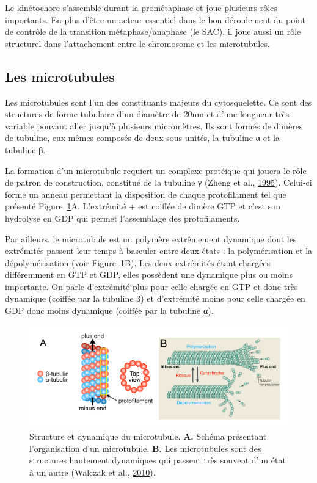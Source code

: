 \documentclass[12pt,a4paper,twoside,openright]{book}
\begin{document}
Le kinétochore s'assemble durant la prométaphase et joue plusieurs rôles
importants. En plus d'être un acteur essentiel dans le bon déroulement
du point de contrôle de la transition métaphase/anaphase (le SAC), il
joue aussi un rôle structurel dans l'attachement entre le chromosome et
les microtubules.

\subsection{Les microtubules}\label{les-microtubules}

Les microtubules sont l'un des constituants majeurs du cytosquelette. Ce
sont des structures de forme tubulaire d'un diamètre de 20nm et d'une
longueur très variable pouvant aller jusqu'à plusieurs micromètres. Ils
sont formés de dimères de tubuline, eux mêmes composés de deux sous
unités, la tubuline α et la tubuline β.

La formation d'un microtubule requiert un complexe protéique qui jouera
le rôle de patron de construction, constitué de la tubuline γ (Zheng et
al., \protect\hyperlink{ref-Zheng1995}{1995}). Celui-ci forme un anneau
permettant la disposition de chaque protofilament tel que présenté
Figure~\ref{fig:mt}A. L'extrémité + est coiffée de dimère GTP et c'est
son hydrolyse en GDP qui permet l'assemblage des protofilaments.

Par ailleurs, le microtubule est un polymère extrêmement dynamique dont
les extrémités passent leur temps à basculer entre deux états : la
polymérisation et la dépolymérisation (voir Figure~\ref{fig:mt}B). Les
deux extrémités étant chargées différemment en GTP et GDP, elles
possèdent une dynamique plus ou moins importante. On parle d'extrémité
plus pour celle chargée en GTP et donc très dynamique (coiffée par la
tubuline β) et d'extrémité moins pour celle chargée en GDP donc moins
dynamique (coiffée par la tubuline α).

\begin{figure}[htbp]
\centering
\includegraphics{figures/intro/mt.png}
\caption[Structure et dynamique du microtubule]{\label{fig:mt}Structure
et dynamique du microtubule. \textbf{A.} Schéma présentant
l'organisation d'un microtubule. \textbf{B.} Les microtubules sont des
structures hautement dynamiques qui passent très souvent d'un état à un
autre (Walczak et al., \protect\hyperlink{ref-Walczak2010}{2010}).}
\end{figure}
\end{document}

